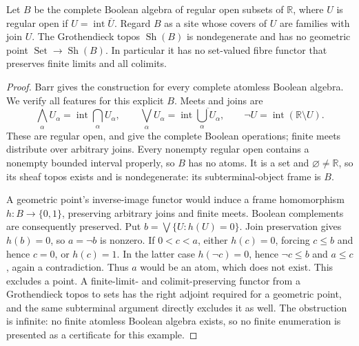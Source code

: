 \begin{proposition}\label{B:pointless}
Let $B$ be the complete Boolean algebra of regular open subsets of $\mathbb R$, where $U$ is regular open if $U=\operatorname{int}\overline U$. Regard $B$ as a site whose covers of $U$ are families with join $U$. The Grothendieck topos $\operatorname{Sh}(B)$ is nondegenerate and has no geometric point $\operatorname{Set}\to\operatorname{Sh}(B)$. In particular it has no set-valued fibre functor that preserves finite limits and all colimits.
\end{proposition}
\begin{proof}
Barr \cite[Introduction, p.~265]{BBarr1974} gives the construction for every complete atomless Boolean algebra. We verify all features for this explicit $B$. Meets and joins are
\[
 \bigwedge_\alpha U_\alpha=\operatorname{int}\!\bigcap_\alpha U_\alpha,
 \qquad
 \bigvee_\alpha U_\alpha=\operatorname{int}\overline{\bigcup_\alpha U_\alpha},
 \qquad \neg U=\operatorname{int}(\mathbb R\setminus U).
\]
These are regular open, and give the complete Boolean operations; finite meets distribute over arbitrary joins. Every nonempty regular open contains a nonempty bounded interval properly, so $B$ has no atoms. It is a set and $\varnothing\ne\mathbb R$, so its sheaf topos exists and is nondegenerate: its subterminal-object frame is $B$.

A geometric point's inverse-image functor would induce a frame homomorphism $h:B\to\{0,1\}$, preserving arbitrary joins and finite meets. Boolean complements are consequently preserved. Put $b=\bigvee\{U:h(U)=0\}$. Join preservation gives $h(b)=0$, so $a=\neg b$ is nonzero. If $0<c<a$, either $h(c)=0$, forcing $c\le b$ and hence $c=0$, or $h(c)=1$. In the latter case $h(\neg c)=0$, hence $\neg c\le b$ and $a\le c$, again a contradiction. Thus $a$ would be an atom, which does not exist. This excludes a point. A finite-limit- and colimit-preserving functor from a Grothendieck topos to sets has the right adjoint required for a geometric point, and the same subterminal argument directly excludes it as well. The obstruction is infinite: no finite atomless Boolean algebra exists, so no finite enumeration is presented as a certificate for this example.
\end{proof}

